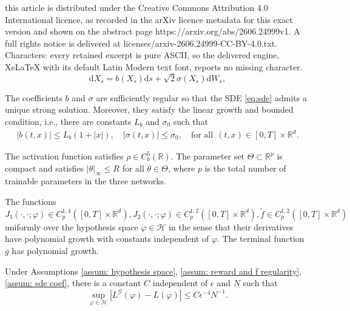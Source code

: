 \documentclass[10pt,a4paper]{amsart}
\newcommand{\R}{\mathbb{R}}
\newcommand{\cH}{\mathcal{H}}
\newcommand{\dd}{\mathrm{d}}
\begin{document}
this article is distributed under the Creative Commons Attribution 4.0 International licence, as recorded in the arXiv licence metadata for this exact version and shown on the abstract page https://arxiv.org/abs/2606.24999v1. A full rights notice is delivered at licenses/arxiv-2606.24999-CC-BY-4.0.txt. Characters: every retained excerpt is pure ASCII, so the delivered engine, XeLaTeX with its default Latin Modern text font, reports no missing character.
\begin{equation}\label{eq:sde}
     \dd X_s = b(X_s) \dd s + \sqrt{2} \sigma(X_s) \dd W_s,
\end{equation}

\begin{assumption}\label{assum: sde coef}
The coefficients $b$ and $\sigma$ are sufficiently regular so that the SDE \eqref{eq:sde} admits a unique strong solution. Moreover, they satisfy the linear growth and bounded condition, i.e., there are constants $ L_b$ and $ \sigma_0$ such that
    \begin{equation}
        \begin{aligned}
            |b(t,x)| \le L_b(1+|x|), \quad |\sigma(t,x)| \le \sigma_0, \quad \text{for all}\ \ (t,x)\in [0,T]\times\R^d.
        \end{aligned}
    \end{equation}
\end{assumption}

\begin{assumption}
\label{assum: hypothesis space}
The activation function satisfies $\rho\in C_b^5(\mathbb R)$.  The parameter set $\Theta\subset\mathbb R^p$ is compact and satisfies $|\theta|_\infty\le R$ for all $\theta\in\Theta$, where $p$ is the total number of trainable parameters in the three networks.
\end{assumption}

\begin{assumption}
\label{assum: reward and f regularity}
The functions $J_1(\cdot, \cdot; \varphi)\in C_p^{1,4}([0,T]\times\R^d), J_2(\cdot,\cdot;\varphi)\in C_p^{1,2}([0,T]\times \R^d), \tilde f \in C_p^{1,2}([0,T]\times \R^d)$ uniformly over the hypothesis space $ \varphi\in \mathcal{H}$ in the sense that their derivatives have polynomial growth with constants
independent of $\varphi$. The terminal function $g$ has polynomial growth.
\end{assumption}

\begin{lemma}\label{lemma: discretization error}
Under Assumptions \ref{assum: hypothesis space}, \ref{assum: reward and f regularity}, \ref{assum: sde coef}, there is a constant $ C$ independent of $ \epsilon$ and $ N$ such that
\begin{equation}
    \sup_{\varphi \in \cH} \left|  L^{\mathscr{G}}(\varphi) - L(\varphi)\right| \le C \epsilon^{-4}N^{-1}.
\end{equation}
\end{lemma}
\end{document}
